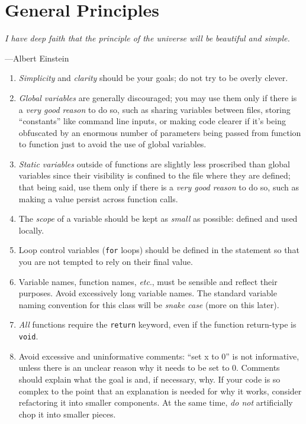 \documentclass[11pt]{article}
\begin{document}
\section{General Principles}

\textwidth
\epigraph{\emph{I have deep faith that the principle of the universe will be
beautiful and simple.}}{---Albert Einstein}\noindent

\begin{enumerate}
  \item \emph{Simplicity} and \emph{clarity} should be your goals; do not try to
    be overly clever.

  \item \emph{Global variables} are generally discouraged; you may use them only
    if there is a \emph{very good reason} to do so, such as sharing variables
    between files, storing ``constants'' like command line inputs, or making
    code clearer if it's being obfuscated by an enormous number of parameters
    being passed from function to function just to avoid the use of global
    variables.

  \item \emph{Static variables} outside of functions are slightly less
    proscribed than global variables since their visibility is confined to the
    file where they are defined; that being said, use them only if there is a
    \emph{very good reason} to do so, such as making a value persist across
    function calls.

  \item The \emph{scope} of a variable should be kept as \emph{small} as possible:
    defined and used locally.

  \item Loop control variables (\texttt{for} loops) should be defined in the
    statement so that you are not tempted to rely on their final value.

  \item Variable names, function names, \emph{etc}., must be sensible and
    reflect their purposes. Avoid excessively long variable names. The standard
    variable naming convention for this class will be \emph{snake case} (more on
    this later).

  \item \emph{All} functions require the \texttt{return} keyword, even if the function
    return-type is \texttt{void}.

  \item Avoid excessive and uninformative comments: ``set x to 0'' is not
    informative, unless there is an unclear reason why it needs to be set to 0.
    Comments should explain what the goal is and, if necessary, why.  If your
    code is so complex to the point that an explanation is needed for why it
    works, consider refactoring it into smaller components. At the same time, \emph{do not}
    artificially chop it into smaller pieces.


\end{enumerate}
\end{document}
